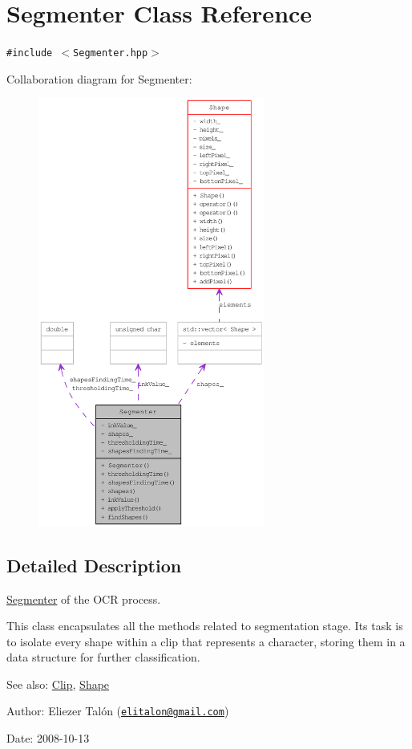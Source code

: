 \hypertarget{class_segmenter}{
\section{Segmenter Class Reference}
\label{class_segmenter}
}
{\tt \#include $<$Segmenter.hpp$>$}

Collaboration diagram for Segmenter:\nopagebreak
\begin{figure}[H]
\begin{center}
\leavevmode
\includegraphics[height=400pt]{class_segmenter__coll__graph}
\end{center}
\end{figure}


\subsection{Detailed Description}
\hyperlink{class_segmenter}{Segmenter} of the OCR process. 

This class encapsulates all the methods related to segmentation stage. Its task is to isolate every shape within a clip that represents a character, storing them in a data structure for further classification.

\begin{Desc}
\item[See also:]\hyperlink{class_clip}{Clip}, \hyperlink{class_shape}{Shape}\end{Desc}
\begin{Desc}
\item[Author:]Eliezer Talón (\href{mailto:elitalon@gmail.com}{\tt elitalon@gmail.com}) \end{Desc}
\begin{Desc}
\item[Date:]2008-10-13 \end{Desc}


